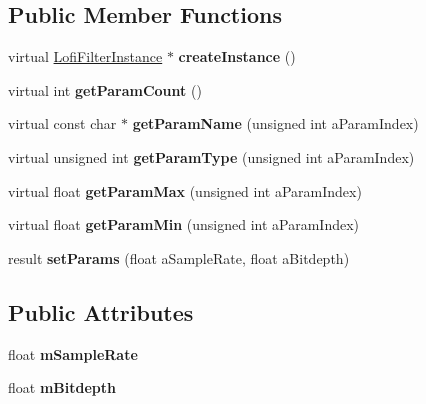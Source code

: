 \subsection*{Public Member Functions}
\begin{DoxyCompactItemize}
\item 
\mbox{\label{class_so_loud_1_1_lofi_filter_a39b2cfbb7c0778643315d3706c7a9f0c}} 
virtual \mbox{\hyperlink{class_so_loud_1_1_lofi_filter_instance}{Lofi\+Filter\+Instance}} $\ast$ {\bfseries create\+Instance} ()
\item 
\mbox{\label{class_so_loud_1_1_lofi_filter_a5fac9bd85e6b5649ca9126e375d600f0}} 
virtual int {\bfseries get\+Param\+Count} ()
\item 
\mbox{\label{class_so_loud_1_1_lofi_filter_adcca2707f1dc7ebfc10a3081b1a02297}} 
virtual const char $\ast$ {\bfseries get\+Param\+Name} (unsigned int a\+Param\+Index)
\item 
\mbox{\label{class_so_loud_1_1_lofi_filter_ab944783a4d1d60ea86e192479499100a}} 
virtual unsigned int {\bfseries get\+Param\+Type} (unsigned int a\+Param\+Index)
\item 
\mbox{\label{class_so_loud_1_1_lofi_filter_a427d8cfe506d2b5a95ca1bdd3faaf9bf}} 
virtual float {\bfseries get\+Param\+Max} (unsigned int a\+Param\+Index)
\item 
\mbox{\label{class_so_loud_1_1_lofi_filter_a8b237090d930d0f860d65d74341018bb}} 
virtual float {\bfseries get\+Param\+Min} (unsigned int a\+Param\+Index)
\item 
\mbox{\label{class_so_loud_1_1_lofi_filter_a08192a6e28088cf78518c684dba2e6eb}} 
result {\bfseries set\+Params} (float a\+Sample\+Rate, float a\+Bitdepth)
\end{DoxyCompactItemize}
\subsection*{Public Attributes}
\begin{DoxyCompactItemize}
\item 
\mbox{\label{class_so_loud_1_1_lofi_filter_afe20e30a72a4dc5b932a6a53fb09c3d0}} 
float {\bfseries m\+Sample\+Rate}
\item 
\mbox{\label{class_so_loud_1_1_lofi_filter_a6a2fe000f5f8e87031002de789f8fecc}} 
float {\bfseries m\+Bitdepth}
\end{DoxyCompactItemize}


